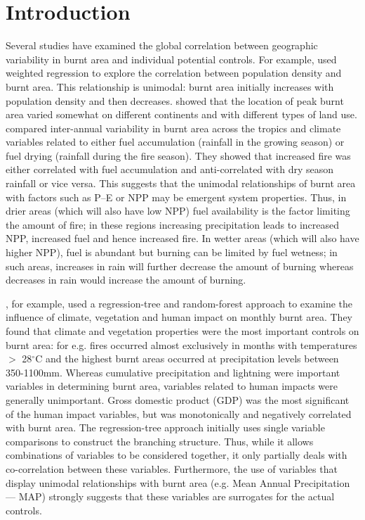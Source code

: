 \section{Introduction}
Several studies have examined the global correlation between geographic variability in burnt area and individual potential controls. For example, \citet{bistinas2014causal} used weighted regression to explore the correlation between population density and burnt area. This relationship is unimodal: burnt area initially increases with population density and then decreases. \citet{bistinas2014causal} showed that the location of peak burnt area varied somewhat on different continents and with different types of land use. \citet{van2008climate} compared inter-annual variability in burnt area across the tropics and climate variables related to either fuel accumulation (rainfall in the growing season) or fuel drying (rainfall during the fire season). They showed that increased fire was either correlated with fuel accumulation and anti-correlated with dry season rainfall or vice versa. This suggests that the unimodal relationships of burnt area with factors such as P--E or NPP may be emergent system properties. Thus, in drier areas (which will also have low NPP) fuel availability is the factor limiting the amount of fire; in these regions increasing precipitation leads to increased NPP, increased fuel and hence increased fire. In wetter areas (which will also have higher NPP), fuel is abundant but burning can be limited by fuel wetness; in such areas, increases in rain will further decrease the amount of burning whereas decreases in rain would increase the amount of burning.

\citet{aldersley2011global}, for example, used a regression-tree and random-forest approach to examine the influence of climate, vegetation and human impact on monthly burnt area. They found that climate and vegetation properties were the most important controls on burnt area: for e.g. fires occurred almost exclusively in months with temperatures $>$ 28$^{\circ}$C and the highest burnt areas occurred at precipitation levels between 350-1100mm. Whereas cumulative precipitation and lightning were important variables in determining burnt area, variables related to human impacts were generally unimportant. Gross domestic product (GDP) was the most significant of the human impact variables, but was monotonically and negatively correlated with burnt area. The regression-tree approach initially uses single variable comparisons to construct the branching structure. Thus, while it allows combinations of variables to be considered together, it only partially deals with co-correlation between these variables. Furthermore, the use of variables that display unimodal relationships with burnt area (e.g. Mean Annual Precipitation --- MAP) strongly suggests that these variables are surrogates for the actual controls.

